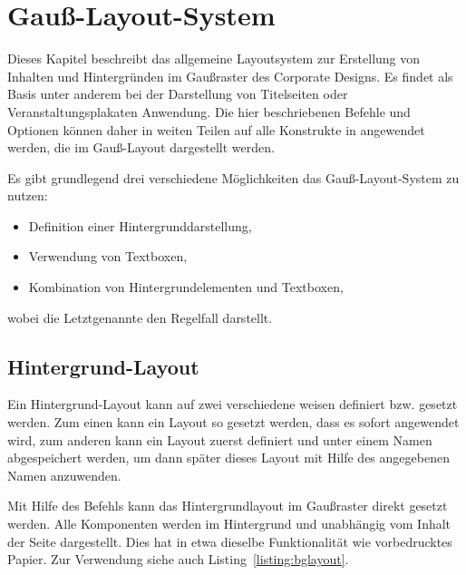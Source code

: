 \chapter{Gauß-Layout-System}\label{chap:gausspage}

Dieses Kapitel beschreibt das allgemeine Layoutsystem zur Erstellung von
Inhalten und Hintergründen im Gaußraster des Corporate Designs.
Es findet als Basis unter anderem bei der Darstellung von Titelseiten oder
Veranstaltungsplakaten Anwendung. Die hier beschriebenen Befehle und Optionen
können daher in weiten Teilen auf alle Konstrukte in \tubslatex angewendet
werden, die im Gauß-Layout dargestellt werden.

Es gibt grundlegend drei verschiedene Möglichkeiten das Gauß-Layout-System
zu nutzen:
\begin{itemize}
  \item Definition einer Hintergrunddarstellung,
  \item Verwendung von Textboxen,
  \item Kombination von Hintergrundelementen und Textboxen,
\end{itemize}
wobei die Letztgenannte den Regelfall darstellt.

\section{Hintergrund-Layout}\label{sec:gausspage:bglayout}

Ein Hintergrund-Layout kann auf zwei verschiedene weisen definiert bzw.
gesetzt werden.
Zum einen kann ein Layout so gesetzt werden, dass es sofort angewendet wird,
zum anderen kann ein Layout zuerst definiert und unter einem Namen
abgespeichert werden, um dann später dieses Layout mit Hilfe des angegebenen 
Namen anzuwenden.

\begin{Declaration}
\end{Declaration}

Mit Hilfe des Befehls  kann das Hintergrundlayout im Gaußraster direkt gesetzt werden.
Alle Komponenten werden im Hintergrund und unabhängig vom Inhalt der Seite
dargestellt.
Dies hat in etwa dieselbe Funktionalität wie vorbedrucktes Papier.
Zur Verwendung siehe auch Listing~\ref{listing:bglayout}.

\begin{Declaration}
  \\
\end{Declaration}

